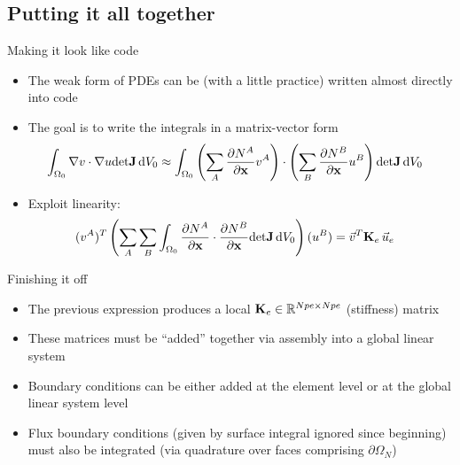 \subsection{Putting it all together}
\begin{frame}{Making it look like code}
  \begin{itemize}
  \item
    The weak form of PDEs can be (with a little practice) written
    almost directly into code
  \item
    The goal is to write the integrals in a matrix-vector form
    \begin{align*}
      \int_{\Omega_0} \nabla v \cdot \nabla u \mathrm{det}\mathbf{J}\,\mathrm{d}V_0 &\approx
      \int_{\Omega_0} \left(\sum_A \frac{\partial N^A}{\partial \mathbf{x}} v^A\right) 
      \cdot \left(\sum_B \frac{\partial N^B}{\partial \mathbf{x}} u^B\right) 
      \mathrm{det}\mathbf{J}\,\mathrm{d}V_0
    \end{align*}
  \item
    Exploit linearity:
    \begin{align*}
      (v^A)^T\left(\sum_A \sum_B \int_{\Omega_0} \frac{\partial N^A}{\partial \mathbf{x}} 
      \cdot \frac{\partial N^B}{\partial \mathbf{x}}
      \mathrm{det}\mathbf{J}\,\mathrm{d}V_0 \right) (u^B)
      &= \vec{v}^T \mathbf{K}_e \,\vec{u}_e
    \end{align*}
  \end{itemize}
\end{frame}


\begin{frame}{Finishing it off}
  \begin{itemize}
  \item
    The previous expression produces a local $\mathbf{K}_e \in \mathbb{R}^{Npe\times Npe}$ (stiffness) matrix
  \item
    These matrices must be ``added'' together via assembly into a global linear system
  \item
    Boundary conditions can be either added at the element level or at the global
    linear system level
  \item
    Flux boundary conditions (given by surface integral ignored since beginning)
    must also be integrated (via quadrature over faces comprising $\partial \Omega_N$)
  \end{itemize}
\end{frame}
